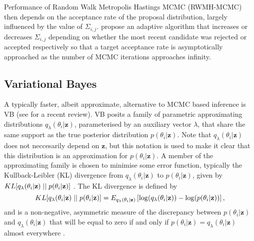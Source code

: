\documentclass[12pt,a4paper]{article}\usepackage[]{graphicx}\usepackage[]{color}
\begin{document}
Performance of Random Walk Metropolis Hastings MCMC (RWMH-MCMC) then depends on the acceptance rate of the proposal distribution, largely influenced by the value of $\Sigma_{i, j}$. \citet{Garthwaite2016} propose an adaptive algorithm that increases or decreases $\Sigma_{i, j}$ depending on whether the most recent candidate was rejected or accepted respectively so that a target acceptance rate is asymptotically approached as the number of MCMC iterations approaches infinity.

\subsection{Variational Bayes}
\label{subsec:VB}

A typically faster, albeit approximate, alternative to MCMC based inference is VB (see \citet{Blei2017} for a recent review). VB posits a family of parametric approximating distributions $q_{\lambda}(\theta_i | \textbf{z})$, parameterised by an auxiliary vector $\lambda$, that share the same support as the true posterior distribution $p(\theta_i | \textbf{z})$. Note that $q_{\lambda}(\theta_i | \textbf{z})$ does not neccesarily depend on $\textbf{z}$, but this notation is used to make it clear that this distribution is an approximation for $p(\theta_i | \textbf{z})$. A member of the approximating family is chosen to minimise some error function, typically the Kullback-Leibler (KL) divergence from $q_{\lambda}(\theta_i | \textbf{z})$ to $p(\theta_i | \textbf{z})$, given by $KL[q_{\lambda}(\theta_i | \textbf{z})\hspace{.1cm}||\hspace{.1cm}p(\theta_i | \textbf{z})]$ \citep{Kullback1951}. The KL divergence is defined by
\begin{equation}
\label{KL-def}
KL[q_{\lambda}(\theta_i | \textbf{z})\hspace{.1cm}||\hspace{.1cm}p(\theta_i | \textbf{z})] = E_{q_{\lambda}(\theta_i | \textbf{z})} \left[ \log(q_{\lambda}(\theta_i | \textbf{z})) - \log(p(\theta_i | \textbf{z})) \right],
\end{equation}
and is a non-negative, asymmetric measure of the discrepancy between $p(\theta_i | \textbf{z})$ and $q_{\lambda}(\theta_i | \textbf{z})$  that will be equal to zero if and only if $p(\theta_i | \textbf{z}) = q_{\lambda}(\theta_i | \textbf{z})$ almost everywhere \citep{Bishop2006}.
\\
\end{document}
